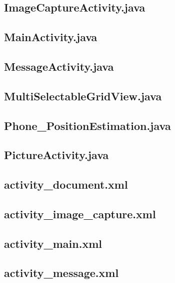 \documentclass[11pt,a4j]{jarticle}
\begin{document}
\subsection{ImageCaptureActivity.java}
	
	\newpage
\subsection{MainActivity.java}
	
	\newpage
\subsection{MessageActivity.java}
	
	\newpage
\subsection{MultiSelectableGridView.java}
	
	\newpage
\subsection{Phone\_PositionEstimation.java}
	
	\newpage
\subsection{PictureActivity.java}
	
	\newpage


\subsection{activity\_document.xml}
	
	\newpage
\subsection{activity\_image\_capture.xml}
	
	\newpage
\subsection{activity\_main.xml}
	
	\newpage
\subsection{activity\_message.xml}
	
	\newpage
\end{document}
